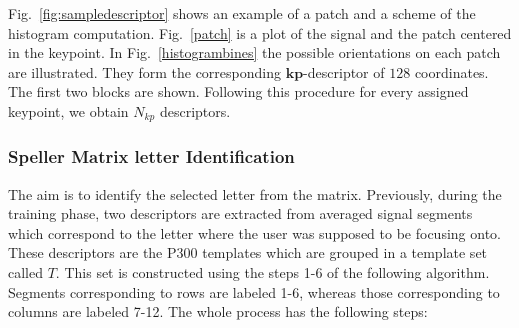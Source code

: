 \documentclass[utf8]{frontiersSCNS} %
\begin{document}
Fig.~\ref{fig:sampledescriptor} shows an example of a patch and a scheme of the histogram computation. Fig.~\ref{patch} is a plot of the signal and the patch centered in the keypoint. In Fig.~\ref{histogrambines} the possible orientations on each patch are illustrated. They form the corresponding $\mathbf{kp}$-descriptor of $128$ coordinates. The first two blocks are shown.  Following this procedure for every assigned keypoint, we obtain $N_{kp}$ descriptors.
 
 
\subsubsection{Speller Matrix letter Identification}
\label{Classification}


The aim is to identify the selected letter from the matrix. Previously, during the training phase, two descriptors are extracted from averaged signal segments which correspond to the letter where the user was supposed to be focusing onto.  These descriptors are the P300 templates which are grouped in a template set called $ T $.  This set is constructed using the steps 1-6 of the following algorithm.  Segments corresponding to rows are labeled 1-6, whereas those corresponding to columns are labeled 7-12.  The whole process has the following steps:
\end{document}
